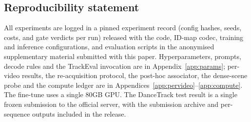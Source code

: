 \documentclass{article} %
\begin{document}
\subsection*{Reproducibility statement}
All experiments are logged in a pinned experiment record (config hashes, seeds, costs, and
gate verdicts per run) released with the code, ID-map codec, training and inference
configurations, and evaluation scripts in the anonymised supplementary material
submitted with this paper. Hyperparameters, prompts, decode rules and the
TrackEval invocation are in Appendix~\ref{app:params}; per-video results, the
re-acquisition protocol, the post-hoc associator, the dense-scene probe and the compute
ledger are in Appendices~\ref{app:pervideo}--\ref{app:compute}. The fine-tune uses a single
80GB GPU. The DanceTrack test result is a single frozen submission to the official server,
with the submission archive and per-sequence outputs included in the release.




\appendix
\end{document}
